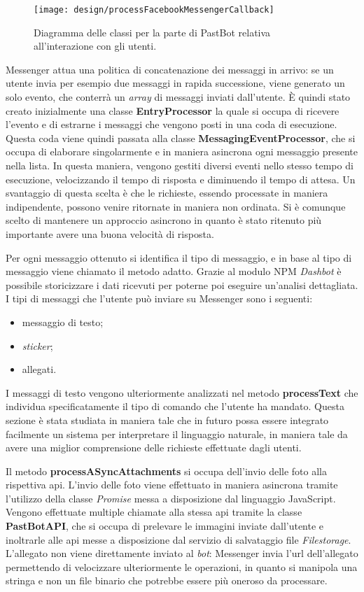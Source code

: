 \begin{figure}[H]
  \centering
  \texttt{[image: design/processFacebookMessengerCallback]}
  \caption{Diagramma delle classi per la parte di PastBot relativa
all'interazione con gli utenti.}
\end{figure}

Messenger attua una politica di concatenazione dei messaggi in arrivo: se un
utente invia per esempio due messaggi in rapida successione, viene generato un
solo evento, che conterrà un \textit{array} di messaggi inviati dall'utente. È
quindi stato creato inizialmente una classe \textbf{EntryProcessor} la quale si
occupa di ricevere l'evento e di estrarne i messaggi che vengono posti in una
coda di esecuzione.
Questa coda viene quindi passata alla classe \textbf{MessagingEventProcessor},
che si occupa di elaborare singolarmente e in maniera asincrona ogni messaggio
presente nella lista. In questa maniera, vengono gestiti diversi eventi nello
stesso tempo di esecuzione, velocizzando il tempo di risposta e diminuendo il
tempo di attesa. Un svantaggio di questa scelta è che le richieste,
essendo processate in maniera indipendente, possono venire ritornate in maniera
non ordinata. Si è comunque scelto di mantenere un approccio asincrono in
quanto è stato ritenuto più importante avere una buona velocità di risposta.

Per ogni messaggio ottenuto si identifica il tipo di messaggio, e in base al
tipo di messaggio viene chiamato il metodo adatto. Grazie al modulo NPM
\textit{Dashbot} è possibile storicizzare i dati ricevuti per poterne poi
eseguire un'analisi dettagliata.
I tipi di messaggi che l'utente può inviare su Messenger sono i seguenti:
\begin{itemize}
  \item messaggio di testo;
  \item \textit{sticker};
  \item allegati.
\end{itemize}
I messaggi di testo vengono ulteriormente analizzati nel metodo
\textbf{processText} che individua specificatamente il tipo di comando che
l'utente ha mandato. Questa sezione è stata studiata in maniera tale che in
futuro possa essere integrato facilmente un sistema per interpretare il
linguaggio naturale, in maniera tale da avere una miglior comprensione delle
richieste effettuate dagli utenti.

Il metodo \textbf{processASyncAttachments} si occupa dell'invio delle foto
alla rispettiva \gls{api}. L'invio delle foto viene effettuato in maniera
asincrona tramite l'utilizzo della classe \textit{Promise} messa a disposizione
dal linguaggio JavaScript. Vengono effettuate multiple chiamate alla stessa
\gls{api} tramite la classe \textbf{PastBotAPI}, che si occupa di prelevare le
immagini inviate dall'utente e inoltrarle alle \gls{api} messe a disposizione
dal servizio di salvataggio file \textit{Filestorage}.
L'allegato non viene direttamente inviato al \textit{bot}: Messenger invia
l'\gls{url} dell'allegato permettendo di velocizzare ulteriormente le
operazioni, in quanto si manipola una stringa e non un file binario che
potrebbe essere più oneroso da processare.

